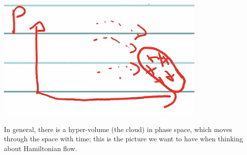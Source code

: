 \documentclass[../PHYS306Notes.tex]{subfiles}
\begin{document}
\begin{center}
    \includegraphics[scale=0.8]{Lecture-25/l25-img3.png}
\end{center}
In general, there is a hyper-volume (the cloud) in phase space, which moves through the space with time; this is the picture we want to have when thinking about Hamiltonian flow. 
\end{document}
